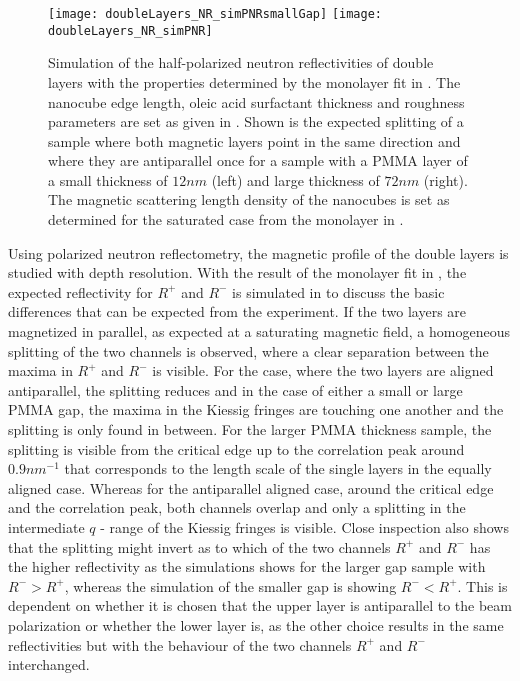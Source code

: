 \documentclass[\main/dresen_thesis.tex]{subfiles}
\begin{document}
  \label{sec:doubleLayers:pnr}

  \begin{figure}[tb]
    \centering
    \texttt{[image: doubleLayers\_NR\_simPNRsmallGap]}
    \texttt{[image: doubleLayers\_NR\_simPNR]}
    \caption{\label{fig:doubleLayers:pnrSimulation}Simulation of the half-polarized neutron reflectivities of double layers with the properties determined by the monolayer fit in . The nanocube edge length, oleic acid surfactant thickness and roughness parameters are set as given in . Shown is the expected splitting of a sample where both magnetic layers point in the same direction and where they are antiparallel once for a sample with a PMMA layer of a small thickness of $12 \unit{nm}$ (left) and large thickness of $72 \unit{nm}$ (right). The magnetic scattering length density of the nanocubes is set as determined for the saturated case from the monolayer in .}
  \end{figure}

  Using polarized neutron reflectometry, the magnetic profile of the double layers is studied with depth resolution.
  With the result of the monolayer fit in , the expected reflectivity for $R^{+}$ and $R^{-}$ is simulated in  to discuss the basic differences that can be expected from the experiment.
  If the two layers are magnetized in parallel, as expected at a saturating magnetic field, a homogeneous splitting of the two channels is observed, where a clear separation between the maxima in $R^{+}$ and $R^{-}$ is visible.
  For the case, where the two layers are aligned antiparallel, the splitting reduces and in the case of  either a small or large PMMA gap, the maxima in the Kiessig fringes are touching one another and the splitting is only found in between.
  For the larger PMMA thickness sample, the splitting is visible from the critical edge up to the correlation peak around $0.9 \unit{nm^{-1}}$ that corresponds to the length scale of the single layers in the equally aligned case.
  Whereas for the antiparallel aligned case, around the critical edge and the correlation peak, both channels overlap and only a splitting in the intermediate $q$ - range of the Kiessig fringes is visible.
  Close inspection also shows that the splitting might invert as to which of the two channels $R^{+}$ and $R^{-}$ has the higher reflectivity as the simulations shows for the larger gap sample with $R^{-} > R^{+}$, whereas the simulation of the smaller gap is showing $R^{-} < R^{+}$.
  This is dependent on whether it is chosen that the upper layer is antiparallel to the beam polarization or whether the lower layer is, as the other choice results in the same reflectivities but with the behaviour of the two channels $R^{+}$ and $ R^{-}$ interchanged.
  \\
\end{document}
